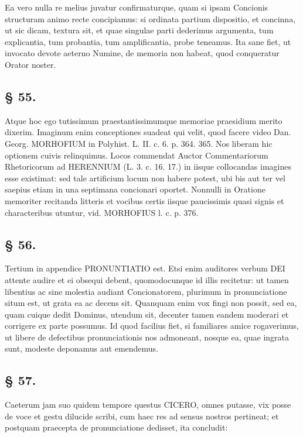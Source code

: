Ea vero nulla re melius juvatur confirmaturque, quam si ipsam Concionis structuram animo recte concipiamus: si ordinata partium dispositio, et concinna, ut sic dicam, textura sit, et quae singulae parti dederimus argumenta, tum explicantia, tum probantia, tum amplificantia, probe teneamus. Ita sane fiet, ut invocato devote aeterno Numine, de memoria non habeat, quod conqueratur Orator noster.

\subsection*{§ 55.}

Atque hoc ego tutissimum praestantissimumque memoriae praesidium merito dixerim. Imaginum enim conceptiones suadeat qui velit, quod facere video Dan. Georg. MORHOFIUM in Polyhist. L. II. c. 6. p. 364. 365. Nos liberam hic optionem cuivis relinquimus. Locos commendat Auctor Commentariorum Rhetoricorum ad HERENNIUM (L. 3. c. 16. 17.) in iisque collocandas imagines esse existimat: sed tale artificium locum non habere potest, ubi bis aut ter vel saepius etiam in una septimana concionari oportet. Nonnulli in Oratione memoriter recitanda litteris et vocibus certis iisque paucissimis quasi signis et characteribus utuntur, vid. MORHOFIUS l. c. p. 376.

\subsection*{§ 56.}

Tertium in appendice PRONUNTIATIO est. Etsi enim auditores verbum DEI attente audire et ei obsequi debent, quomodocunque id illis recitetur: ut tamen
libentius ac sine molestia audiant Concionatorem, plurimum in pronunciatione situm est, ut grata ea ac decens sit. Quanquam enim vox fingi non possit, sed ea, quam cuique dedit Dominus, utendum sit, decenter tamen eandem moderari et corrigere ex parte possumus. Id quod facilius fiet, si familiares amice rogaverimus, ut libere de defectibus pronunciationis nos admoneant, nosque ea, quae ingrata sunt, modeste deponamus aut emendemus.

\subsection*{§ 57.}

Caeterum jam suo quidem tempore questus CICERO, omnes putasse, vix posse de voce et gestu dilucide scribi, cum haec res ad sensus nostros pertineat; et postquam praecepta de pronunciatione dedisset, ita concludit:

